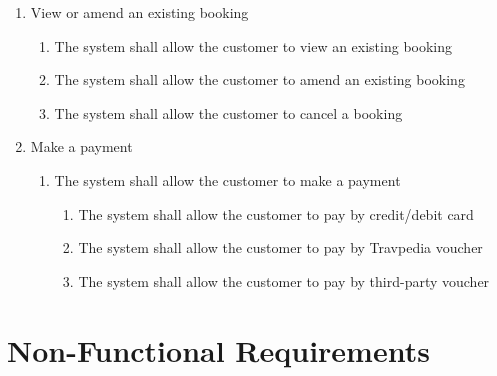 \documentclass{article}
\begin{document}
\begin{enumerate}
	\item View or amend an existing booking
	\begin{enumerate}
		\item The system shall allow the customer to view an existing booking
		\item The system shall allow the customer to amend an existing booking
		\item The system shall allow the customer to cancel a booking
	\end{enumerate}

	\item Make a payment
	\begin{enumerate}
		\item The system shall allow the customer to make a payment
		\begin{enumerate}
			\item The system shall allow the customer to pay by credit/debit card
			\item The system shall allow the customer to pay by Travpedia voucher
			\item The system shall allow the customer to pay by third-party voucher
		\end{enumerate}
	\end{enumerate}
\end{enumerate}

\section{Non-Functional Requirements}
\label{ref:non_functional_requirements}
\end{document}
